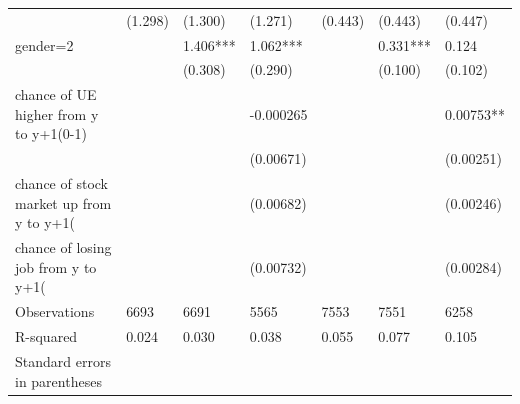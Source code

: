 \documentclass[]{article}
\begin{document}
\begin{table}
\begin{tabular}{lllllll}
		& (1.298)   & (1.300)      & (1.271)   & (0.443)   & (0.443)   & (0.447)    \\
		gender=2                                        &           & 1.406***     & 1.062***  &           & 0.331***  & 0.124      \\
		&           & (0.308)      & (0.290)   &           & (0.100)   & (0.102)    \\
		chance of UE higher from y to y+1(0-1)          &           &              & -0.000265 &           &           & 0.00753**  \\
		&           &              & (0.00671) &           &           & (0.00251)  \\
		chance of stock market up from y to y+1(%
		&           &              & (0.00682) &           &           & (0.00246)  \\
		chance of losing job from y to y+1(%
		&           &              & (0.00732) &           &           & (0.00284)  \\
			\hline 
		Observations                                    & 6693      & 6691         & 5565      & 7553      & 7551      & 6258       \\
		R-squared                                       & 0.024     & 0.030        & 0.038     & 0.055     & 0.077     & 0.105      \\
		Standard errors in parentheses                  &           &              &           &           &           &            \\
		\hline 
	\end{tabular}
\end{table}



\end{document}
